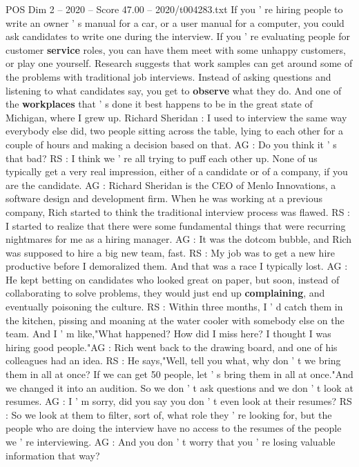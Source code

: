 \begin{textsample}{POS Dim 2 – 2020 – Score 47.00 – 2020/t004283.txt}
If you ' re hiring people to write an owner ' s manual for a car, or a user manual for a computer, you could ask candidates to write one during the interview.
If you ' re evaluating people for customer \textbf{service} roles, you can have them meet with some unhappy customers, or play one yourself.
Research suggests that work samples can get around some of the problems with traditional job interviews.
Instead of asking questions and listening to what candidates say, you get to \textbf{observe} what they do.
And one of the \textbf{workplaces} that ' s done it best happens to be in the great state of Michigan, where I grew up.
Richard Sheridan : I used to interview the same way everybody else did, two people sitting across the table, lying to each other for a couple of hours and making a decision based on that.
AG : Do you think it ' s that bad?
RS : I think we ' re all trying to puff each other up.
None of us typically get a very real impression, either of a candidate or of a company, if you are the candidate.
AG : Richard Sheridan is the CEO of Menlo Innovations, a software design and development firm.
When he was working at a previous company, Rich started to think the traditional interview process was flawed.
RS : I started to realize that there were some fundamental things that were recurring nightmares for me as a hiring manager.
AG : It was the dotcom bubble, and Rich was supposed to hire a big new team, fast.
RS : My job was to get a new hire productive before I demoralized them.
And that was a race I typically lost.
AG : He kept betting on candidates who looked great on paper, but soon, instead of collaborating to solve problems, they would just end up \textbf{complaining}, and eventually poisoning the culture.
RS : Within three months, I ' d catch them in the kitchen, pissing and moaning at the water cooler with somebody else on the team.
And I ' m like,"What happened?
How did I miss here?
I thought I was hiring good people."AG : Rich went back to the drawing board, and one of his colleagues had an idea.
RS : He says,"Well, tell you what, why don ' t we bring them in all at once?
If we can get 50 people, let ' s bring them in all at once."And we changed it into an audition.
So we don ' t ask questions and we don ' t look at resumes.
AG : I ' m sorry, did you say you don ' t even look at their resumes?
RS : So we look at them to filter, sort of, what role they ' re looking for, but the people who are doing the interview have no access to the resumes of the people we ' re interviewing.
AG : And you don ' t worry that you ' re losing valuable information that way?

\end{textsample}
